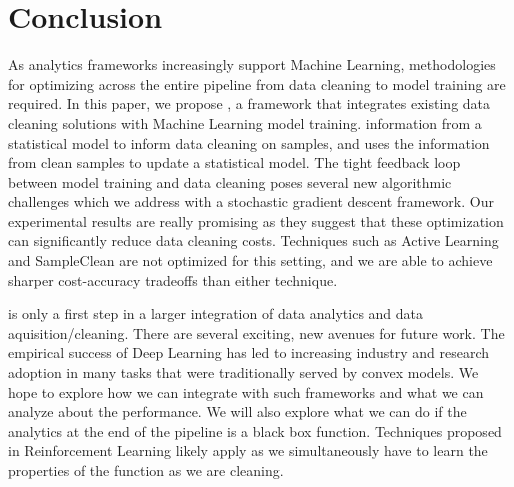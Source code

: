 \vspace{-1.0em}
\section{Conclusion}
As analytics frameworks increasingly support Machine Learning, methodologies for optimizing across the entire pipeline from data cleaning to model training are required.
In this paper, we propose \sysfull, a framework that integrates existing data cleaning solutions with Machine Learning model training.
\sys information from a statistical model to inform data cleaning on samples, and uses the information from clean samples to update a statistical model.
The tight feedback loop between model training and data cleaning poses several new algorithmic challenges which we address with a stochastic gradient descent framework.
Our experimental results are really promising as they suggest that these optimization can significantly reduce data cleaning costs.
Techniques such as Active Learning and SampleClean are not optimized for this setting, and we are able to achieve sharper cost-accuracy tradeoffs than either technique.

\sys is only a first step in a larger integration of data analytics and data aquisition/cleaning. 
There are several exciting, new avenues for future work.
The empirical success of Deep Learning has led to increasing industry and research adoption in many tasks that were traditionally served by convex models.
We hope to explore how we can integrate with such frameworks and what we can analyze about the performance.
We will also explore what we can do if the analytics at the end of the pipeline is a black box function.
Techniques proposed in Reinforcement Learning likely apply as we simultaneously have to learn the properties of the function as we are cleaning.